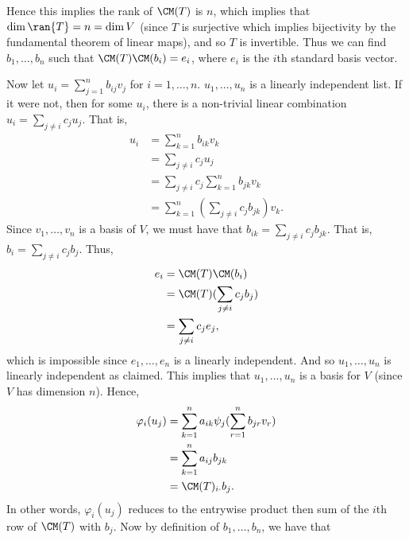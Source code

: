 \documentclass{book}
\begin{document}
\begin{enumerate}[label=\arabic*)]
      Hence this implies the rank of $\CM(T)$ is $n$, which implies that $\dim{\ran{T}} = n = \dim{V}$ (since $T$ is surjective which implies bijectivity by the fundamental theorem of linear
      maps), and so $T$ is invertible. Thus we can find $b_1, \dots, b_n$ such that $\CM(T)\CM(b_i) = e_i$, where $e_i$ is the $i$th standard basis vector.

      Now let $u_i = \sum_{j = 1}^{n}b_{ij}v_j$ for $i = 1, \dots, n$. $u_1, \dots, u_n$ is a linearly independent list. If it were not, then for some $u_i$, there is a non-trivial linear
      combination $u_i = \sum_{j \neq i}c_ju_j$. That is,
      \begin{align*}
        u_i & = \sum_{k = 1}^{n}b_{ik}v_k \\
        & = \sum_{j \neq i}c_ju_j \\
        & = \sum_{j \neq i}c_j\sum_{k = 1}^{n}b_{jk}v_k \\
        & = \sum_{k = 1}^{n}(\sum_{j \neq i}c_jb_{jk})v_k.
      \end{align*}
      Since $v_1, \dots, v_n$ is a basis of $V$, we must have that $b_{ik} = \sum_{j \neq i}c_jb_{jk}$. That is, $b_i = \sum_{j \neq i}c_jb_j$. Thus,
      \begin{align*}
        e_i & = \CM(T)\CM(b_i) \\
        & = \CM(T)(\sum_{j \neq i}c_jb_j) \\
        & = \sum_{j \neq i}c_je_j,
      \end{align*}
      which is impossible since $e_1, \dots, e_n$ is a linearly independent. And so $u_1, \dots, u_n$ is linearly independent as claimed. This implies that $u_1, \dots, u_n$ is a basis for
      $V$ (since $V$ has dimension $n$). Hence,
      \begin{align*}
        \varphi_i(u_j) & = \sum_{k = 1}^{n}a_{ik}\psi_j(\sum_{r = 1}^{n}b_{jr}v_r) \\
        & = \sum_{k = 1}^{n}a_{ij}b_{jk} \\
        & = \CM(T)_{i\cdot}b_j.
      \end{align*}
      In other words, $\varphi_i(u_j)$ reduces to the entrywise product then sum of the $i$th row of $\CM(T)$ with $b_j$. Now by definition of $b_1, \dots, b_n$, we have that

\end{enumerate}
\end{document}
